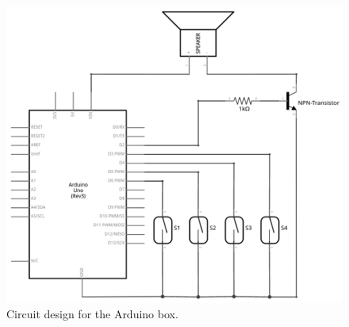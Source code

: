 \begin{colsection}
\begin{figure}[t]
    \begin{center}
        \includegraphics[width=0.75\linewidth]{images/arduino.png}
    \end{center}
    \caption[Circuit design for the Arduino box]{
        Circuit design for the Arduino box.
    }\label{fig:arduino_circuit}
\end{figure}

\newpage


\end{colsection}
